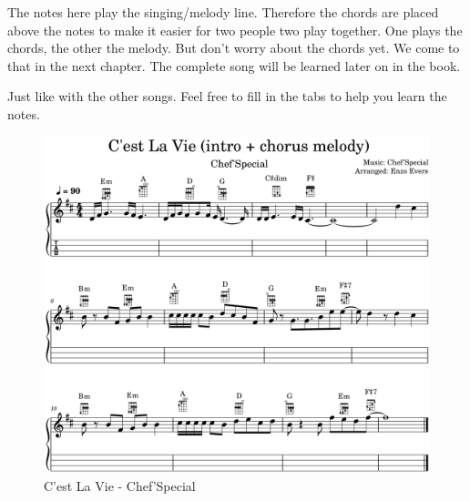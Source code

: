 The notes here play the singing/melody line. Therefore the chords are placed above the notes to make it easier for two people two play together. One plays the chords, the other the melody. But don't worry about the chords yet. We come to that in the next chapter. The complete song will be learned later on in the book.

Just like with the other songs. Feel free to fill in the tabs to help you learn the notes.

\begin{figure}[h]
	\centering
	\includegraphics[width=\textwidth]{../../MuseScore/Ukulele/UkuleleCestLaVieChefSpecial_IntroChorus.png}
	\caption{C'est La Vie - Chef'Special}
	\label{fig:ukulele_cest_la_vie_chefspecial}
\end{figure}
